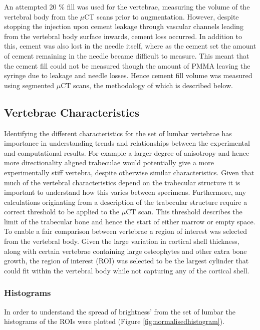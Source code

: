 An attempted 20 \% fill was used for the vertebrae, measuring the volume of the vertebral body from the $\mu$CT scans prior to augmentation.
However, despite stopping the injection upon cement leakage through vascular channels leading from the vertebral body surface inwards, cement loss occurred.
In addition to this, cement was also lost in the needle itself, where as the cement set the amount of cement remaining in the needle became difficult to measure.
This meant that the cement fill could not be measured though the amount of PMMA leaving the syringe due to leakage and needle losses.
Hence cement fill volume was measured using segmented $\mu$CT scans, the methodology of which is described below.

\subsection{Vertebrae Characteristics}

Identifying the different characteristics for the set of lumbar vertebrae has
importance in understanding trends and relationships between the experimental
and computational results. For example a larger degree of anisotropy and hence
more directionality aligned trabeculae would potentially give a more
experimentally stiff vertebra, despite otherwise similar characteristics. Given
that much of the vertebral characteristics depend on the trabecular structure it
is important to understand how this varies between specimens. Furthermore, any
calculations originating from a description of the trabecular structure require
a correct threshold to be applied to the $\mu$CT scan. This threshold describes
the limit of the trabecular bone and hence the start of either marrow or empty
space. To enable a fair comparison between vertebrae a region of interest was
selected from the vertebral body. Given the large variation in cortical shell
thickness, along with certain vertebrae containing large osteophytes and other
extra bone growth, the region of interest (ROI) was selected to be the largest
cylinder that could fit within the vertebral body while not capturing any of the
cortical shell.

\subsubsection{Histograms}

In order to understand the spread of brightness' from the set of lumbar the
histograms of the ROIs were plotted (Figure \ref{fig:normalisedhistogram}).

